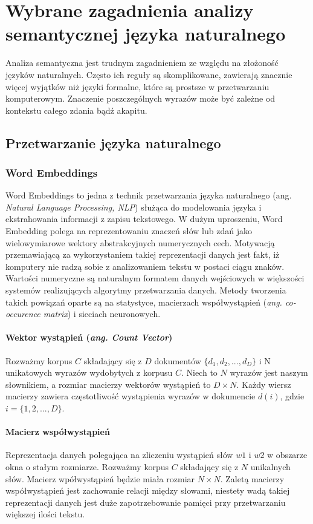 \chapter{Wybrane zagadnienia analizy semantycznej języka naturalnego}

Analiza semantyczna jest trudnym zagadnieniem ze względu na złożoność języków naturalnych. Często ich reguły są skomplikowane, zawierają znacznie więcej wyjątków niż języki formalne, które są prostsze w przetwarzaniu komputerowym. Znaczenie poszczególnych wyrazów może być zależne od kontekstu całego zdania bądź akapitu.

\section{Przetwarzanie języka naturalnego}

\subsection{Word Embeddings}
Word Embeddings to jedna z technik przetwarzania języka naturalnego  (ang. \textit{Natural Language Processing, NLP}) służąca do modelowania języka i ekstrahowania informacji z zapisu tekstowego. W dużym uproszeniu, Word Embedding polega na reprezentowaniu znaczeń słów lub zdań jako wielowymiarowe wektory abstrakcyjnych numerycznych cech. Motywacją przemawiającą za wykorzystaniem takiej reprezentacji danych jest fakt, iż komputery nie radzą sobie z analizowaniem tekstu w postaci ciągu znaków. Wartości numeryczne są naturalnym formatem danych wejściowych w większości systemów realizujących algorytmy przetwarzania danych. Metody tworzenia takich powiązań oparte są na statystyce, macierzach współwystąpień (\textit{ang. co-occurence matrix}) i sieciach neuronowych.

\subsubsection{Wektor wystąpień (\textit{ang. Count Vector})}
Rozważmy korpus $C$ składający się z $D$ dokumentów $\{d_1, d_2,..., d_D\}$ i N unikatowych wyrazów wydobytych z korpusu $C$. Niech to $N$ wyrazów jest naszym słownikiem, a rozmiar macierzy wektorów wystąpień to $D \times N$. Każdy wiersz macierzy zawiera częstotliwość wystąpienia wyrazów w dokumencie $d(i)$, gdzie $i = \{1, 2, ... ,D\}$.

\subsubsection{Macierz współwystąpień}
Reprezentacja danych polegająca na zliczeniu wystąpień słów $w1$ i $w2$ w obszarze okna o stałym rozmiarze. Rozważmy korpus $C$ składający się z $N$ unikalnych słów. Macierz wpółwystąpień będzie miała rozmiar $N \times N$. Zaletą macierzy współwystąpień jest zachowanie relacji między słowami, niestety wadą takiej reprezentacji danych jest duże zapotrzebowanie pamięci przy przetwarzaniu większej ilości tekstu.

